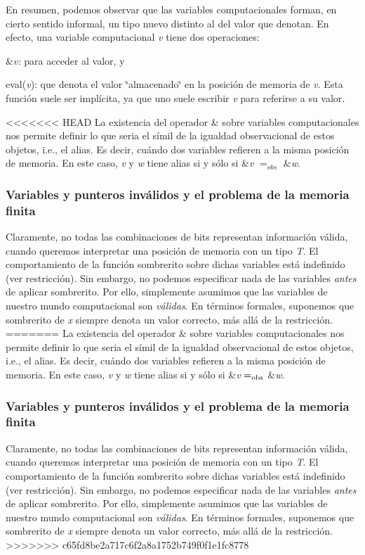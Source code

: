 \-En resumen, podemos observar que las variables computacionales forman, en cierto sentido informal, un tipo nuevo distinto al del valor que denotan. \-En efecto, una variable computacional {\itshape v\/} tiene dos operaciones\-:
\begin{DoxyEnumerate}
\item \&{\itshape v\-:\/} para acceder al valor, y
\item eval({\itshape v\/})\-: que denota el valor \char`\"{}almacenado\char`\"{} en la posición de memoria de {\itshape v\/}. \-Esta función suele ser implícita, ya que uno suele escribir {\itshape v\/} para referirse a su valor.
\end{DoxyEnumerate}

<<<<<<< HEAD
\-La existencia del operador \& sobre variables computacionales nos permite definir lo que seria el símil de la igualdad observacional de estos objetos, i.\-e., el alias. \-Es decir, cuándo dos variables refieren a la misma posición de memoria. \-En este caso, {\itshape v\/} y {\itshape w\/} tiene alias si y sólo si \&{\itshape v\/} $=_{obs}$ \&{\itshape w\/}.\hypertarget{Aliasing_sec-invalido}{}\subsubsection{\-Variables y punteros inválidos y el problema de la memoria finita}\label{Aliasing_sec-invalido}
\-Claramente, no todas las combinaciones de bits representan información válida, cuando queremos interpretar una posición de memoria con un tipo {\itshape \-T\/}. \-El comportamiento de la función sombrerito sobre dichas variables está indefinido (ver restricción). \-Sin embargo, no podemos especificar nada de las variables {\itshape antes\/} de aplicar sombrerito. \-Por ello, simplemente asumimos que las variables de nuestro mundo computacional son {\itshape válidas\/}. \-En términos formales, suponemos que sombrerito de {\itshape x\/} siempre denota un valor correcto, más allá de la restricción.
=======
La existencia del operador \& sobre variables computacionales nos permite definir lo que seria el símil de la igualdad observacional de estos objetos, i.\+e., el alias. Es decir, cuándo dos variables refieren a la misma posición de memoria. En este caso, {\itshape v} y {\itshape w} tiene alias si y sólo si \&{\itshape v} $=_{\rm obs}$ \&{\itshape w}.\hypertarget{Aliasing_sec-invalido}{}\subsubsection{Variables y punteros inválidos y el problema de la memoria finita}\label{Aliasing_sec-invalido}
Claramente, no todas las combinaciones de bits representan información válida, cuando queremos interpretar una posición de memoria con un tipo {\itshape T}. El comportamiento de la función sombrerito sobre dichas variables está indefinido (ver restricción). Sin embargo, no podemos especificar nada de las variables {\itshape antes} de aplicar sombrerito. Por ello, simplemente asumimos que las variables de nuestro mundo computacional son {\itshape válidas}. En términos formales, suponemos que sombrerito de {\itshape x} siempre denota un valor correcto, más allá de la restricción.
>>>>>>> c65fd8be2a717c6f2a8a1752b749f0f1e1fc8778


